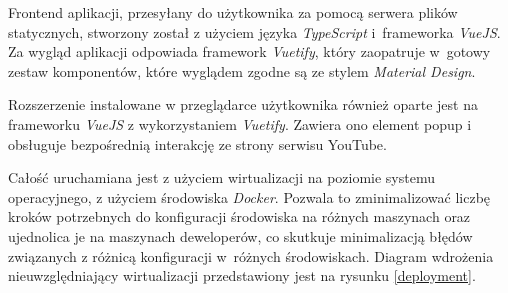 Frontend aplikacji, przesyłany do użytkownika za pomocą serwera plików statycznych, stworzony został z użyciem języka \textit{TypeScript} i~frameworka \textit{VueJS}\cite{VueJS}. Za wygląd aplikacji odpowiada framework \textit{Vuetify}\cite{Vuetify}, który zaopatruje w~gotowy zestaw komponentów, które wyglądem zgodne są ze stylem \textit{Material Design}\cite{Material Design}.

Rozszerzenie instalowane w przeglądarce użytkownika również oparte jest na frameworku \textit{VueJS} z wykorzystaniem \textit{Vuetify}. Zawiera ono element popup i obsługuje bezpośrednią interakcję ze strony serwisu YouTube.

Całość uruchamiana jest z użyciem wirtualizacji na poziomie systemu operacyjnego, z użyciem środowiska \textit{Docker}\cite{Docker}. Pozwala to zminimalizować liczbę kroków potrzebnych do konfiguracji środowiska na różnych maszynach oraz ujednolica je na maszynach deweloperów, co skutkuje minimalizacją błędów związanych z różnicą konfiguracji w~różnych środowiskach. Diagram wdrożenia nieuwzględniający wirtualizacji przedstawiony jest na rysunku \ref{deployment}.
